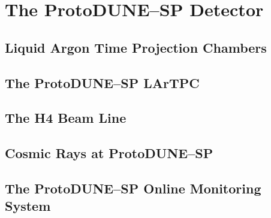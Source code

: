 % 

\chapter{\label{ch:3-protodune}The ProtoDUNE--SP Detector} 

\minitoc

\section{Liquid Argon Time Projection Chambers}

\section{The ProtoDUNE--SP LArTPC}

\section{The H4 Beam Line}

\section{Cosmic Rays at ProtoDUNE--SP}

\section{The ProtoDUNE--SP Online Monitoring System}

